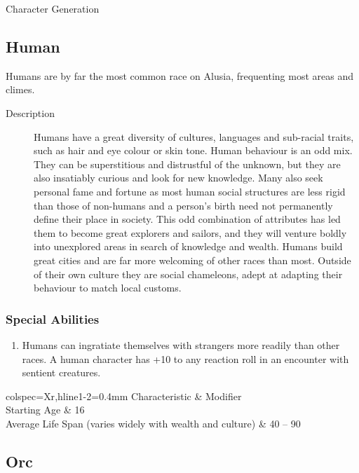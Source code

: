 \begin{Chapter}{Character Generation}
\subsection{Human}

Humans are by far the most common race on Alusia, frequenting most
areas and climes.

\begin{description}
\item[Description] Humans have a great diversity of cultures,
  languages and sub-racial traits, such as hair and eye colour or skin
  tone.  Human behaviour is an odd mix.  They can be superstitious and
  distrustful of the unknown, but they are also insatiably curious and
  look for new knowledge.  Many also seek personal fame and fortune as
  most human social structures are less rigid than those of non-humans
  and a person’s birth need not permanently define their place in
  society.  This odd combination of attributes has led them to become
  great explorers and sailors, and they will venture boldly into
  unexplored areas in search of knowledge and wealth.  Humans build
  great cities and are far more welcoming of other races than most.
  Outside of their own culture they are social chameleons, adept at
  adapting their behaviour to match local customs.
\end{description}

\subsubsection{Special Abilities}

\begin{enumerate}

\item Humans can ingratiate themselves with strangers more readily
  than other races.  A human character has +10 to any reaction roll in
  an encounter with sentient creatures.

\end{enumerate}

\smallskip

\begin{dqtblr}{colspec={Xr},hline{1-2}={0.4mm}}
Characteristic				& Modifier \\
Starting Age				& 16 \pl \\
Average Life Span (varies widely with wealth and culture) & 40 -- 90 \\
\end{dqtblr}

\subsection{Orc}


\end{Chapter}
